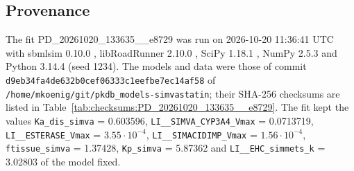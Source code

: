 \subsection{Provenance}

The fit PD\_20261020\_133635\_\_e8729 was run on 2026-10-20 11:36:41 UTC with sbmlsim 0.10.0 \cite{Koenig2026_sbmlsim}, libRoadRunner 2.10.0 \cite{Welsh2023}, SciPy 1.18.1 \cite{Virtanen2020}, NumPy 2.5.3 \cite{Harris2020} and Python 3.14.4 (seed 1234). The models and data were those of commit \texttt{d9eb34fa4de632b0cef06333c1eefbe7ec14af58} of \texttt{/home/mkoenig/git/pkdb\_models-simvastatin}; their SHA-256 checksums are listed in Table~\ref{tab:checksums:PD_20261020_133635__e8729}. The fit kept the values \texttt{Ka\_dis\_simva} = 0.603596, \texttt{LI\_\_SIMVA\_CYP3A4\_Vmax} = 0.0713719, \texttt{LI\_\_ESTERASE\_Vmax} = $3.55 \cdot 10^{-4}$, \texttt{LI\_\_SIMACIDIMP\_Vmax} = $1.56 \cdot 10^{-4}$, \texttt{ftissue\_simva} = 1.37428, \texttt{Kp\_simva} = 5.87362 and \texttt{LI\_\_EHC\_simmets\_k} = 3.02803 of the model fixed.

